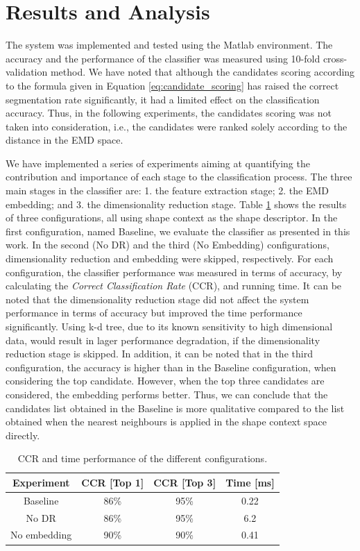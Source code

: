 \documentclass[10pt, conference, compsocconf]{IEEEtran}
\begin{document}
\section{Results and Analysis}
\label{sec:results_analysis}

The system was implemented and tested using the Matlab environment.
The accuracy and the performance of the classifier was measured using 10-fold cross-validation method.
We have noted that although the candidates scoring according to the formula given in Equation \ref{eq:candidate_scoring} has raised the correct segmentation rate significantly, it had a limited effect on the classification accuracy. 
Thus, in the following experiments, the candidates scoring was not taken into consideration, i.e., the candidates were ranked solely according to the distance in the EMD space.

We have implemented a series of experiments aiming at quantifying the contribution and importance of each stage to the classification process.
The three main stages in the classifier are: 1. the feature extraction stage; 2. the EMD embedding; and 3. the dimensionality reduction stage.
Table \ref{table:dr_embedding_comparison} shows the results of three configurations, all using shape context as the shape descriptor.
In the first configuration, named Baseline, we evaluate the classifier as presented in this work.
In the second (No DR) and the third (No Embedding) configurations, dimensionality reduction and embedding were skipped, respectively.
For each configuration, the classifier performance was measured in terms of accuracy, by calculating the \emph{Correct Classification Rate} (CCR), and running time.
It can be noted that the dimensionality reduction stage did not affect the system performance in terms of accuracy but improved the time performance significantly.
Using k-d tree, due to its known sensitivity to high dimensional data, would result in lager performance degradation, if the dimensionality reduction stage is skipped.
In addition, it can be noted that in the third configuration, the accuracy is higher than in the Baseline configuration, when considering the top candidate. 
However, when the top three candidates are considered, the embedding performs better.
Thus, we can conclude that the candidates list obtained in the Baseline is more qualitative compared to the list obtained when the nearest neighbours is applied in the shape context space directly.

\begin{table}
\centering
\begin{tabular}{ | c | c | c | c |}
  \hline
  Experiment  & CCR [Top 1]  & CCR [Top 3] & Time [ms]\\
  \hline                 
  Baseline & 86\% & 95\% & 0.22 \\
  \hline
  No DR & 86\% & 95\% & 6.2 \\ 
  \hline
  No embedding & 90\% &  90\% & 0.41 \\
  \hline
\end{tabular}
\caption{CCR and time performance of the different configurations.}
\label{table:dr_embedding_comparison} 
\end{table}
\end{document}
